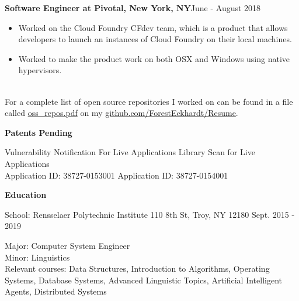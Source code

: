 \documentclass[10pt,a4papaer]{article}
\begin{document}
{\begin{itemize}[noitemsep, topsep=0pt]
			
		\end{itemize}
	
		{\noindent\textbf{Software Engineer at Pivotal, New York, NY}}{\hfill June - August 2018}
		\begin{itemize}[noitemsep, topsep=0pt]
			\item Worked on the Cloud Foundry CFdev team, which is a product that allows developers to launch an instances of Cloud Foundry on their local machines.
			\item Worked to make the product work on both OSX and Windows using native hypervisors.
		\end{itemize}
			{\noindent\\ For a complete list of open source repositories I worked on can be found in a file called \href{http://www.github.com/ForestEckhardt/Resume/blob/master/oss_repos.pdf}{ oss\_repos.pdf} on my \href{http://www.github.com/ForestEckhardt/Resume}{github.com/ForestEckhardt/Resume}}.\\
	
		
		\setlength{\leftskip}{0pt}
		
		{\noindent\textbf{Patents Pending}\vspace*{-20px}\\}
		
		\noindent\makebox[\linewidth]{\rule{\textwidth}{1.2pt}}
		
		\setlength{\leftskip}{15pt}
		
		\noindent Vulnerability Notification For Live Applications {\hfill Library Scan for Live Applications}\\
		Application ID: 38727-0153001 {\hfill Application ID: 38727-0154001\quad}\\
		
		\setlength{\leftskip}{0pt}
		
		{\noindent\textbf{Education}}\vspace*{-20px}\\
		
		\noindent\makebox[\linewidth]{\rule{\textwidth}{1.3pt}}
		
		{ School: Rensselaer Polytechnic Institute 110 8th St, Troy, NY 12180 {\hfill Sept. 2015 - 2019}}
		
		\setlength{\leftskip}{50pt}
		
		{\noindent Major: Computer System Engineer\\ Minor: Linguistics\\
			Relevant courses: Data Structures, Introduction to Algorithms, Operating Systems, Database Systems, Advanced Linguistic Topics, Artificial Intelligent Agents, Distributed Systems}\\
		
}
\end{document}
